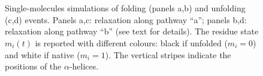\begin{figure}[!htb]
\centering
{}
\\
\\
\caption{\label{fig:spaccaocchi} 
Single-molecules simulations of folding (panels a,b) and unfolding (c,d) events.
Panels a,c: relaxation along pathway ``a''; panels b,d: relaxation along pathway
``b'' (see text for details).
The residue state $m_i(t)$ is reported
with different colours: black if unfolded ($m_i=0$) and white if native ($m_i=1$).
The vertical stripes indicate the positions of the $\alpha$-helices.
}
\end{figure}

